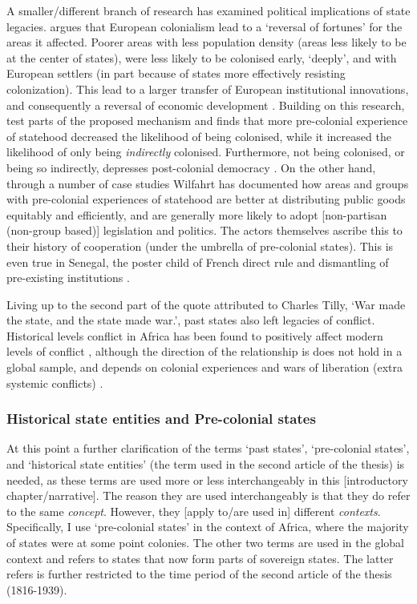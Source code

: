 \documentclass[12pt]{article}
\begin{document}
A smaller/different branch of research has examined political implications of
state legacies. \citet{Acemoglu_2002} argues that European colonialism lead to a
`reversal  of fortunes' for the areas it affected. Poorer areas with less
population density (areas less likely to be at the center of states), were less
likely to be colonised early, `deeply', and with European settlers (in part
because of states more effectively resisting colonization). This lead to a
larger transfer of European institutional innovations, and consequently a
reversal of economic development \citep{Acemoglu_2002}. Building on this
research, \citet{Hariri2012} test parts of the proposed mechanism and finds that
more pre-colonial experience of statehood decreased the likelihood of being
colonised, while it increased the likelihood of only being \textit{indirectly}
colonised. Furthermore, not being colonised, or being so indirectly, depresses
post-colonial democracy \citep{Hariri2012}. On the other hand, through a number
of case studies Wilfahrt \citeyear{Wilfahrt2018, Wilfahrt_2021} has documented
how areas and groups with pre-colonial experiences of statehood are better at
distributing public goods equitably and efficiently, and are generally more
likely to adopt [non-partisan (non-group based)] legislation and politics. The
actors themselves ascribe this to their history of cooperation (under the
umbrella of pre-colonial states). This is even true in Senegal, the poster child
of French direct rule and dismantling of pre-existing institutions
\citep{Wilfahrt_2021}.

Living up to the second part of the quote attributed to Charles Tilly, `War
made the state, and the state made war.', past states also left legacies of
conflict. Historical levels conflict in Africa has been found to positively
affect modern levels of conflict \citep{Besley2014}, although the direction of
the relationship is does not hold in a global sample, and depends on colonial
experiences and wars of liberation (extra systemic conflicts)
\citep{Fearon2014}. 

\subsubsection{Historical state entities and Pre-colonial states} 
\label{Historical state entities and Pre-colonial states}

At this point a further clarification of the terms `past states',
`pre-colonial states', and `historical state entities' (the term used in the
second article of the thesis) is needed, as these terms are used more or less
interchangeably in this [introductory chapter/narrative]. The reason they are
used interchangeably is that they do refer to the same \textit{concept}.
However, they [apply to/are used in] different \textit{contexts}. Specifically,
I use `pre-colonial states' in the context of Africa, where the majority of
states were at some point colonies. The other two terms are used in the global
context and refers to states that now form parts of sovereign states. The latter
refers is further restricted to the time period of the second article of the
thesis (1816-1939).
\end{document}
